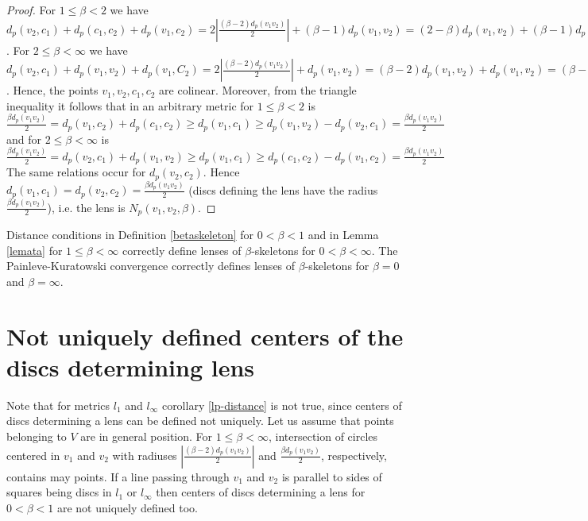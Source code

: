 \documentclass[11pt]{llncs}
\begin{document}
\begin{proof}
For $1\leq \beta < 2$ we have
$d_p(v_2, c_1)+d_p(c_1, c_2)+d_p(v_1, c_2)= 
2|\frac{(\beta -2) d_p(v_1v_2)}{2}|+(\beta -1)d_p(v_1,v_2)=
(2-\beta)d_p(v_1,v_2)+(\beta -1)d_p(v_1,v_2)=d_p(v_1, v_2)$.
For $2 \leq \beta<\infty$ we have
$d_p(v_2, c_1)+d_p(v_1, v_2)+d_p(v_1, C_2)= 
2|\frac{(\beta -2) d_p(v_1v_2)}{2}|+d_p(v_1,v_2)=
(\beta-2)d_p(v_1,v_2)+d_p(v_1,v_2)=(\beta -1)d_p(v_1, v_2)=d_p(c_1, c_2)$.
Hence, the points $v_1, v_2, c_1, c_2$ are colinear.
Moreover, from the triangle inequality it follows that
in an arbitrary metric for $1 \leq \beta < 2$ is 
$\frac{\beta d_p(v_1v_2)}{2}=d_p(v_1, c_2)+d_p(c_1, c_2) \geq d_p(v_1, c_1) \geq 
d_p(v_1, v_2)-d_p(v_2, c_1)=\frac{\beta d_p(v_1v_2)}{2}$
and for $2 \leq \beta < \infty$ is
$\frac{\beta d_p(v_1v_2)}{2}=d_p(v_2, c_1)+d_p(v_1, v_2) \geq d_p(v_1, c_1) \geq 
d_p(c_1, c_2)-d_p(v_1, c_2)=\frac{\beta d_p(v_1v_2)}{2}$
The same relations occur for $d_p(v_2, c_2)$. 
Hence $d_p(v_1, c_1)=d_p(v_2, c_2)=\frac{\beta d_p(v_1v_2)}{2}$ (discs defining the lens
have the radius $\frac{\beta d_p(v_1v_2)}{2}$), i.e. the lens is $N_p(v_1,v_2, \beta)$.
\end{proof}

\begin{corollary}
\label{lp-distance}
Distance conditions in Definition \ref{betaskeleton} for $0<\beta<1$ and in Lemma \ref{lemata}
for $1 \leq \beta <\infty$ correctly define lenses of $\beta$-skeletons for $0 < \beta <\infty$.
The Painleve-Kuratowski convergence correctly defines lenses of $\beta$-skeletons for $\beta=0$ 
and $\beta=\infty$. 
\end{corollary}



\section{Not uniquely defined centers of the discs determining lens}
\label{l1-section}

Note that for metrics $l_1$ and $l_{\infty}$ corollary \ref{lp-distance} is not true,
since centers of discs determining a lens can be defined not uniquely.
Let us assume that points belonging to $V$ are in general position.
For $1 \leq \beta < \infty$, intersection of circles centered in $v_1$ and $v_2$ with
radiuses $|\frac{(\beta -2) d_p(v_1v_2)}{2}|$ and $\frac{\beta d_p(v_1v_2)}{2}$,
respectively, contains may points. 
If a line passing through $v_1$ and $v_2$ is parallel to sides of squares being discs 
in $l_1$ or $l_{\infty}$ then centers of discs determining a lens for $0 < \beta < 1$ 
are not uniquely defined too.
      
\end{document}
